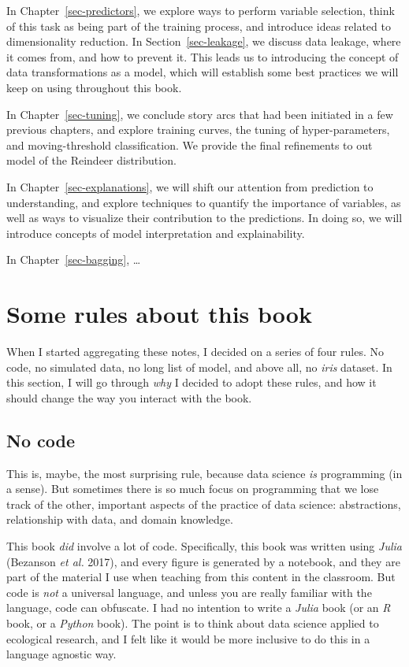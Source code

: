 \documentclass[
  letterpaper,
]{scrbook}
\begin{document}
In Chapter~\ref{sec-predictors}, we explore ways to perform variable
selection, think of this task as being part of the training process, and
introduce ideas related to dimensionality reduction. In
Section~\ref{sec-leakage}, we discuss data leakage, where it comes from,
and how to prevent it. This leads us to introducing the concept of data
transformations as a model, which will establish some best practices we
will keep on using throughout this book.

In Chapter~\ref{sec-tuning}, we conclude story arcs that had been
initiated in a few previous chapters, and explore training curves, the
tuning of hyper-parameters, and moving-threshold classification. We
provide the final refinements to out model of the Reindeer distribution.

In Chapter~\ref{sec-explanations}, we will shift our attention from
prediction to understanding, and explore techniques to quantify the
importance of variables, as well as ways to visualize their contribution
to the predictions. In doing so, we will introduce concepts of model
interpretation and explainability.

In Chapter~\ref{sec-bagging}, \ldots{}

\section{Some rules about this book}\label{some-rules-about-this-book}

When I started aggregating these notes, I decided on a series of four
rules. No code, no simulated data, no long list of model, and above all,
no \emph{iris} dataset. In this section, I will go through \emph{why} I
decided to adopt these rules, and how it should change the way you
interact with the book.

\subsection{No code}\label{no-code}

This is, maybe, the most surprising rule, because data science \emph{is}
programming (in a sense). But sometimes there is so much focus on
programming that we lose track of the other, important aspects of the
practice of data science: abstractions, relationship with data, and
domain knowledge.

This book \emph{did} involve a lot of code. Specifically, this book was
written using \emph{Julia} (Bezanson \emph{et al.} 2017), and every
figure is generated by a notebook, and they are part of the material I
use when teaching from this content in the classroom. But code is
\emph{not} a universal language, and unless you are really familiar with
the language, code can obfuscate. I had no intention to write a
\emph{Julia} book (or an \emph{R} book, or a \emph{Python} book). The
point is to think about data science applied to ecological research, and
I felt like it would be more inclusive to do this in a language agnostic
way.
\end{document}
